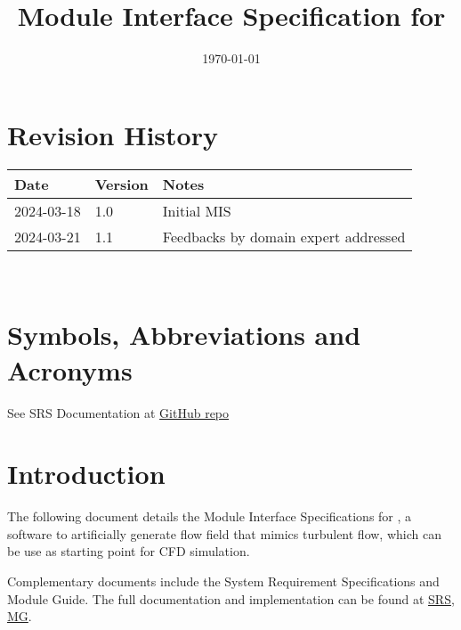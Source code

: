 \documentclass[12pt, titlepage]{article}
\begin{document}
\title{Module Interface Specification for \progname{}}

\author{\authname}

\date{\today}

\maketitle


\section{Revision History}

\begin{tabularx}{\textwidth}{p{3cm}p{2cm}X}
\toprule {\bf Date} & {\bf Version} & {\bf Notes}\\
\midrule
2024-03-18 & 1.0 & Initial MIS\\
2024-03-21 & 1.1 & Feedbacks by domain expert addressed\\
\bottomrule
\end{tabularx}

~\newpage

\section{Symbols, Abbreviations and Acronyms}

See SRS Documentation at \href{https://github.com/omltcat/turbulent-flow/blob/main/docs/SRS/SRS.pdf}{GitHub repo}


\newpage

\tableofcontents

\newpage


\section{Introduction}

The following document details the Module Interface Specifications for \progname{}, a software to artificially generate flow field that mimics turbulent flow, which can be use as starting point for CFD simulation.

Complementary documents include the System Requirement Specifications
and Module Guide.  The full documentation and implementation can be
found at \href{https://github.com/omltcat/turbulent-flow/blob/main/docs/SRS/SRS.pdf}{SRS}, \href{https://github.com/omltcat/turbulent-flow/blob/main/docs/Design/SoftArchitecture/MG.pdf}{MG}.  
\end{document}
